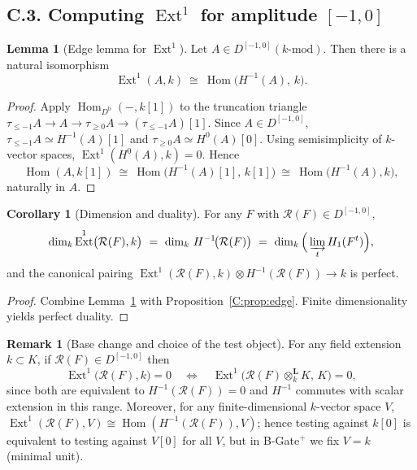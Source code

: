 \documentclass[11pt]{article}
\numberwithin{equation}{section}
\theoremstyle{plain}
\theoremstyle{definition}
\theoremstyle{remark}
\DeclareMathOperator{\Ext}{Ext}
\DeclareMathOperator{\Hom}{Hom}
\theoremstyle{plain}
\theoremstyle{definition}
\numberwithin{equation}{section}
\newtheorem{lemma}[theorem]{Lemma}
\newtheorem{corollary}[theorem]{Corollary}
\theoremstyle{definition}
\newtheorem{remark}[theorem]{Remark}
\numberwithin{equation}{section}
\theoremstyle{plain}
\theoremstyle{definition}
\theoremstyle{remark}
\begin{document}
\subsection*{C.3. Computing \texorpdfstring{$\Ext^1$}{Ext1} for amplitude \([-1,0]\)}

\begin{lemma}[Edge lemma for \(\Ext^1\)]\label{C:lem:edge-ext}
Let \(A\in D^{[-1,0]}(k\text{-mod})\).
Then there is a natural isomorphism
\[
\Ext^1(A,k)\ \cong\ \Hom\!\big(H^{-1}(A),\,k\big).
\]
\end{lemma}

\begin{proof}
Apply \(\Hom_{D^{\mathrm{b}}}(-,k[1])\) to the truncation triangle
\(\tau_{\le -1}A\to A\to \tau_{\ge 0}A\to (\tau_{\le -1}A)[1]\).
Since \(A\in D^{[-1,0]}\), \(\tau_{\le -1}A\simeq H^{-1}(A)[1]\) and \(\tau_{\ge 0}A\simeq H^{0}(A)[0]\).
Using semisimplicity of \(k\)-vector spaces, \(\Ext^1(H^{0}(A),k)=0\).
Hence
\[
\Hom(A,k[1])\ \cong\ \Hom\!\big(H^{-1}(A)[1],\,k[1]\big)\ \cong\ \Hom\!\big(H^{-1}(A),k\big),
\]
naturally in \(A\).
\end{proof}

\begin{corollary}[Dimension and duality]\label{C:cor:dim}
For any \(F\) with \(\mathcal{R}(F)\in D^{[-1,0]}\),
\[
\dim_k \Ext^1\!\big(\mathcal{R}(F),k\big)\ =\ \dim_k\, H^{-1}\!\big(\mathcal{R}(F)\big)\ =\ \dim_k\Big(\varinjlim_t H_1(F^t)\Big),
\]
and the canonical pairing \(\Ext^1(\mathcal{R}(F),k)\otimes H^{-1}(\mathcal{R}(F))\to k\) is perfect.
\end{corollary}

\begin{proof}
Combine Lemma~\ref{C:lem:edge-ext} with Proposition~\ref{C:prop:edge}.
Finite dimensionality yields perfect duality.
\end{proof}

\begin{remark}[Base change and choice of the test object]\label{C:rk:base-change}
For any field extension \(k\subset K\), if \(\mathcal{R}(F)\in D^{[-1,0]}\) then
\[
\Ext^1\!\big(\mathcal{R}(F),k\big)=0\quad\Longleftrightarrow\quad \Ext^1\!\big(\mathcal{R}(F)\otimes_k^{\mathbf{L}}K,\,K\big)=0,
\]
since both are equivalent to \(H^{-1}(\mathcal{R}(F))=0\) and \(H^{-1}\) commutes with scalar extension in this range.
Moreover, for any finite-dimensional \(k\)-vector space \(V\),
\(\Ext^1(\mathcal{R}(F),V)\cong \Hom(H^{-1}(\mathcal{R}(F)),V)\); hence testing against \(k[0]\) is equivalent to testing against \(V[0]\) for all \(V\), but in B-Gate\(^{+}\) we fix \(V=k\) (minimal unit).
\end{remark}
\end{document}
